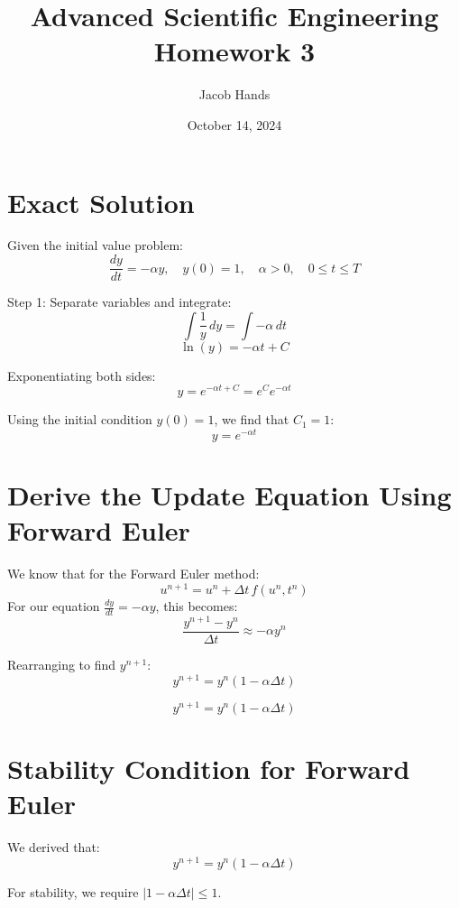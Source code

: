 \documentclass[11pt]{article}
\title{Advanced Scientific Engineering \\ Homework 3}
\author{Jacob Hands}
\date{October 14, 2024}
\begin{document}
\maketitle

\section{Exact Solution}

Given the initial value problem:
\[
\frac{dy}{dt} = -\alpha y, \quad y(0) = 1, \quad \alpha > 0, \quad 0 \leq t \leq T
\]

Step 1: Separate variables and integrate:
\[
\int \frac{1}{y} \, dy = \int -\alpha \, dt
\]
\[
\ln(y) = -\alpha t + C
\]

Exponentiating both sides:
\[
y = e^{-\alpha t + C} = e^C e^{-\alpha t}
\]

Using the initial condition \(y(0) = 1\), we find that \(C_1 = 1\):
\[
y = e^{-\alpha t}
\]

\section{Derive the Update Equation Using Forward Euler}

We know that for the Forward Euler method:
\[
u^{n+1} = u^n + \Delta t \, f(u^n, t^n)
\]
For our equation \(\frac{dy}{dt} = -\alpha y\), this becomes:
\[
\frac{y^{n+1} - y^n}{\Delta t} \approx -\alpha y^n
\]

Rearranging to find \(y^{n+1}\):
\[
y^{n+1} = y^n (1 - \alpha \Delta t)
\]

\begin{tcolorbox}
\[
y^{n+1} = y^n (1 - \alpha \Delta t)
\]
\end{tcolorbox}

\section{Stability Condition for Forward Euler}

We derived that:
\[
y^{n+1} = y^n (1 - \alpha \Delta t)
\]

For stability, we require \(|1 - \alpha \Delta t| \leq 1\).
\end{document}
